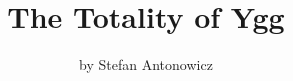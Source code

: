 \documentclass[10pt]{article}
\title{{\Huge\fffancy The Totality of Ygg }}
\author{by Stefan Antonowicz}
\date{}
\newcommand{\yggMechanics}{}
\newcommand{\yggMortals}{}
\newcommand{\yggFae}{}
\newcommand{\yggSkillsSaves}{}
\newcommand{\yggCombat}{}
\newcommand{\yggCivilization}{}
\newcommand{\yggMechanicsText}{}
\newcommand{\yggMortalsText}{}
\newcommand{\yggFaeText}{}
\newcommand{\yggSkillsSavesText}{}
\newcommand{\yggCombatText}{}
\newcommand{\yggCivilizationText}{}
\begin{document}
\fftext
\renewcommand{\thefootnote}{\fnsymbol{footnote}}


\begin{titlingpage}
  \maketitle
\end{titlingpage}

\begin{multicols*}{2}
  \let\clearpage\relax
  \vspace{-5cm}
  \small\fftext\tableofcontents
\end{multicols*}
\vfill\newpage
\noindent\yggMechanics
\vfill\newpage
\begin{multicols}{2}
  \noindent\yggMechanicsText
\end{multicols}
\vfill\newpage
\noindent\yggMortals
\vfill\newpage
\begin{multicols}{2}
  \noindent\yggMortalsText
\end{multicols}
\vfill\newpage
\noindent\yggFae
\vfill\newpage
\begin{multicols}{2}
  \noindent\yggFaeText
\end{multicols}
\vfill\newpage
\noindent\yggSkillsSaves
\vfill\newpage
\begin{multicols}{2}
  \noindent\yggSkillsSavesText
\end{multicols}
\vfill\newpage

\noindent\yggCombat
\vfill\newpage
\begin{multicols}{2}
  \noindent\yggCombatText
\end{multicols}
\vfill\newpage

\noindent\yggCivilization
\vfill\newpage
\begin{multicols}{2}
  \noindent\yggCivilizationText
\end{multicols}
\vfill\newpage
\end{document}
